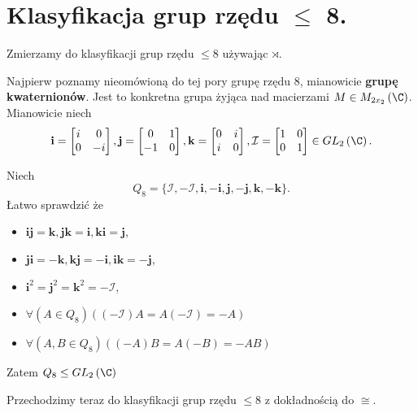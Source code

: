 \section{Klasyfikacja grup rzędu $\le $ 8.}

\begin{context}
Zmierzamy do klasyfikacji grup rzędu $\le 8$ używając $\rtimes$.
\end{context}

Najpierw poznamy nieomówioną do tej pory grupę rzędu 8, mianowicie \textbf{grupę kwaternionów}. Jest to konkretna grupa żyjąca nad macierzami $M\in M_{2x_2}\left( \C \right) $. Mianowicie niech
\[
	\mathbf{i} =\begin{bmatrix} i & 0 \\0&-i \end{bmatrix}, \mathbf{j} = \begin{bmatrix} 0&1 \\ -1& 0 \end{bmatrix}, \mathbf{k} = \begin{bmatrix} 0 & i \\ i & 0 \end{bmatrix}, \mathcal{I} = \begin{bmatrix} 1 & 0 \\ 0 & 1 \end{bmatrix}  \in GL_2\left( \C \right) 
.\] 

Niech \[
Q_{8} = \{\mathcal{I}, -\mathcal{I}, \mathbf{i} , -\mathbf{i}, \mathbf{j}, -\mathbf{j} , \mathbf{k}, -\mathbf{k}  \} 
.\] 
Łatwo sprawdzić że
\begin{itemize}
	\item $\mathbf{i} \mathbf{j} = \mathbf{k}, \mathbf{j} \mathbf{k} = \mathbf{i}, \mathbf{k} \mathbf{i} = \mathbf{j} $,
	\item $\mathbf{j} \mathbf{i} = -\mathbf{k}, \mathbf{k} \mathbf{j} = -\mathbf{i}, \mathbf{i} \mathbf{k} = -\mathbf{j} $,
	\item  $\mathbf{i} ^{2} = \mathbf{j} ^{2} = \mathbf{k} ^2 = -\mathcal{I}$,
	\item $\forall\left(A\in Q_8\right) \left( \left( -\mathcal{I} \right) A = A\left( -\mathcal{I} \right) = -A \right) $
	\item $\forall\left(A,B \in Q_8\right)\left( \left( -A \right) B = A\left( -B \right) = -AB \right)  $
\end{itemize}

Zatem $Q_8 \le GL_{2}\left( \C \right) $

Przechodzimy teraz do klasyfikacji grup rzędu $\le 8$ z dokładnością do $\cong$.

